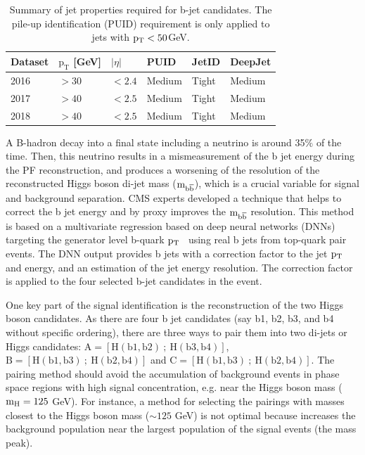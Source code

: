 \begin{table}[htb]
\caption[Summary of jet properties required for b-jet candidates]{\label{eventselection:tab:bjetreq} Summary of jet properties required for b-jet candidates. The pile-up identification (PUID) requirement is only applied to jets with $\mathrm{p_{T}}<50$GeV.}
\centering
\begin{tabularx}{\textwidth}{XXXXXX}
	\hline
	Dataset & $\mathrm{p_{T}}$ [GeV] & $|\eta|$ & PUID & JetID & DeepJet\\
	\hline
	2016 & $> 30$ & $<2.4$ & Medium & Tight & Medium \\
	2017 & $> 40$ & $<2.5$ & Medium & Tight & Medium \\ 
	2018 & $> 40$ & $<2.5$ & Medium & Tight & Medium \\ 
	\hline
\end{tabularx}
\end{table}

A B-hadron decay into a final state including a neutrino is around 35$\%$ of the time. Then, this neutrino results in a mismeasurement of the b jet energy during the PF reconstruction, and produces a worsening of the resolution of the reconstructed Higgs boson di-jet mass ($\mathrm{m_{b\overline{b}}}$), which is a crucial variable for signal and background separation. CMS experts developed a technique that helps to correct the b jet energy and by proxy improves the $\mathrm{m_{b\overline{b}}}$ resolution. This method is based on a multivariate regression based on deep neural networks (DNNs) targeting the generator level b-quark $\mathrm{p_{T}}$~\cite{cmsbreg} using real b jets from top-quark pair events. The DNN output provides b jets with a correction factor to the jet $\mathrm{p_{T}}$ and energy, and an estimation of the jet energy resolution. The correction factor is applied to the four selected b-jet candidates in the event.

One key part of the signal identification is the reconstruction of the two Higgs boson candidates. 
As there are four b jet candidates (say b1, b2, b3, and b4 without specific ordering), there are three ways to pair them into two di-jets or Higgs candidates: \hbox{$\mathrm{A=[H(b1,b2)~;~H(b3,b4)]}$}, \hbox{$\mathrm{B=[H(b1,b3)~;~H(b2,b4)]}$} and \hbox{$\mathrm{C=[H(b1,b3)~;~H(b2,b4)]}$}. The pairing method should avoid the accumulation of background events in phase space regions with high signal concentration, e.g. near the Higgs boson mass ($\mathrm{m_{H}}=125$ GeV). For instance, a method for selecting the pairings with masses closest to the Higgs boson mass ($\sim 125$ GeV) is not optimal because increases the background population near the largest population of the signal events (the mass peak).

